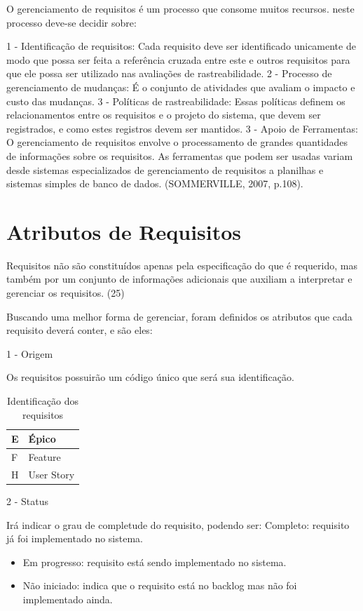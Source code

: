 O gerenciamento de requisitos é um processo que consome muitos recursos. neste processo deve-se decidir sobre:

1 - Identificação de requisitos: Cada requisito deve ser identificado unicamente de modo que possa ser feita a referência cruzada entre este e outros requisitos para que ele possa ser utilizado nas avaliações de rastreabilidade.
2 - Processo de gerenciamento de mudanças: É o conjunto de atividades que avaliam o impacto e custo das mudanças.
3 - Políticas de rastreabilidade: Essas políticas definem os relacionamentos entre os requisitos e o projeto do sistema, que devem ser registrados, e como estes registros devem ser mantidos.
3 - Apoio de Ferramentas: O gerenciamento de requisitos envolve o processamento de grandes quantidades de informações sobre os requisitos. As ferramentas que podem ser usadas variam desde sistemas especializados de gerenciamento de requisitos a planilhas  e sistemas simples de banco de dados.
(SOMMERVILLE, 2007, p.108).

\section{Atributos de Requisitos}

Requisitos não são constituídos apenas pela especificação do que é requerido, mas também por um conjunto de informações adicionais que auxiliam a interpretar e gerenciar os requisitos. (25)

Buscando uma melhor forma de gerenciar, foram definidos os atributos que cada requisito deverá conter, e são eles:

1 - Origem

Os requisitos possuirão um código único que será sua identificação.

\begin{table}[]
\centering
\caption{Identificação dos requisitos}
\label{my-label}
\begin{tabular}{|l|l|}
E & Épico \\ \hline
F & Feature \\ \hline
H & User Story \\ \hline
\end{tabular}
\end{table}


2 - Status

Irá indicar o grau de completude do requisito, podendo ser:
Completo: requisito já foi implementado no sistema.

\begin{itemize}
\item Em progresso: requisito está sendo implementado no sistema.
\item Não iniciado: indica que o requisito está no backlog mas não foi implementado ainda.
\end{itemize}

